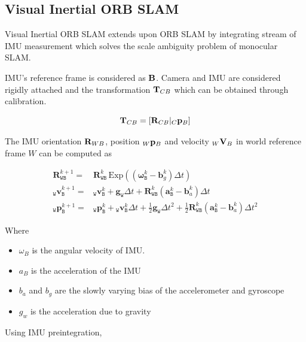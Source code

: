 \subsection{Visual Inertial ORB SLAM}

Visual Inertial ORB SLAM  extends upon ORB SLAM by integrating stream of IMU measurement which solves the scale ambiguity problem of monocular SLAM.

IMU's reference frame is considered as ${\bf B}$. Camera and IMU are considered rigidly attached and the transformation ${\bf T}_{CB}$ which can be obtained through calibration.

\begin{equation}
{\bf T}_{CB} = [{\bf R}_{CB} \vert _C{\bf p}_B]
\end{equation}

The IMU orientation ${\bf R}_{WB}$, position $_W{\bf p}_B$ and velocity $_W{\bf V}_B$ in world reference frame $W$ can be computed as

\begin{align} \mathbf {R}^{k+1}_\mathtt {WB} = & \mathbf {R}^{k}_\mathtt {WB} \, \text{Exp}\left(\left(\boldsymbol {\omega }^k_\mathtt {B} - \boldsymbol {b}^k_g\right)\Delta t\right) \nonumber\\ _\mathtt {W}\mathbf {v}^{k+1}_\mathtt {B} = & {_\mathtt {W}\mathbf {v}^{k}_\mathtt {B}} + \mathbf {g}_\mathtt {W} \Delta t + \mathbf {R}^{k}_\mathtt {WB} \left(\boldsymbol {a}^k_\mathtt {B} - \boldsymbol {b}^k_a\right)\Delta t \nonumber\\ _\mathtt {W}\mathbf {p}^{k+1}_\mathtt {B} = & {_\mathtt {W}\mathbf {p}^{k}_\mathtt {B}} + {_\mathtt {W}\mathbf {v}^{k}_\mathtt {B}} \Delta t + \frac{1}{2}\mathbf {g}_\mathtt {W} \Delta t^2 + \frac{1}{2} \mathbf {R}^{k}_\mathtt {WB} \left(\boldsymbol {a}^k_\mathtt {B} - \boldsymbol {b}^k_a\right)\Delta t^2 \end{align}

Where
\begin{itemize}
	\item ${\omega }_{B}$ is the angular velocity of IMU.
	\item ${a}_{B}$ is the acceleration of the IMU
	\item $b_a$ and $b_g$ are the slowly varying bias of the accelerometer and gyroscope
	\item $g_w$ is the acceleration due to gravity
\end{itemize}

Using IMU preintegration, 

